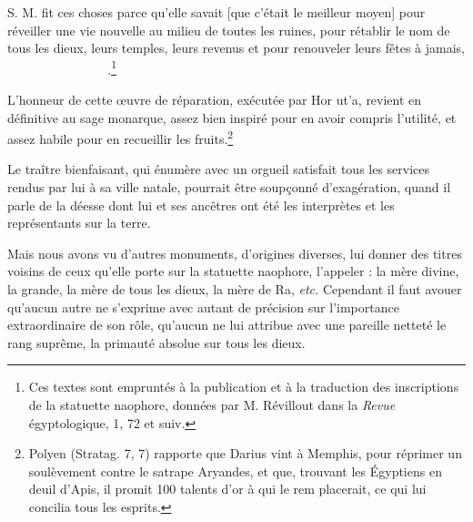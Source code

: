 \documentclass[a4paper, 11pt, oneside]{article}
\newcommand*\hieroAAAH{}
\newcommand*\hieroAABC{\raisebox{0.5ex}{}}
\newcommand*\hieroAACS{}
\newcommand*\hieroAAEF{}
\newcommand*\hieroAAEK{}
\newcommand*\hieroAAEP{\raisebox{0.5ex}{}}
\newcommand*\hieroAAFH{}
\newcommand*\hieroAAHX{}
\newcommand*\hieroAAKT{}
\newcommand*\hieroAALO{}
\newcommand*\hieroAAOH{\raisebox{0.3ex}{}}
\newcommand*\hieroAAOX{}
\newcommand*\hieroAARZ{}
\newcommand*\hieroAASC{}
\newcommand*\hieroAAVY{}
\newcommand*\hieroAAWH{}
\newcommand*\hieroAAWO{}
\newcommand*\hieroAAYI{\raisebox{0.5ex}{}}
\newcommand*\hieroABBP{}
\newcommand*\hieroABBW{}
\newcommand*\hieroABCF{}
\newcommand*\hieroABCG{}
\newcommand*\hieroABCH{}
\newcommand*\hieroABCI{}
\newcommand*\hieroABCJ{}
\newcommand*\hieroABCK{}
\begin{document}
S. M. fit ces choses parce qu’elle savait [que c'était le meilleur moyen] pour réveiller une vie nouvelle au milieu de toutes les ruines, pour rétablir le nom de tous les dieux, leurs temples, leurs revenus et pour renouveler leurs fêtes à jamais, $\hieroAAKT\:\hieroABBW\:\hieroABBP\allowbreak\:\hieroABBP\:\hieroAAYI\:\hieroABCF\allowbreak\:\hieroAASC\hieroAASC\hieroAASC\hieroAASC\allowbreak\:\hieroAAOH\:\hieroAAEP\allowbreak\:\hieroAACS\:\hieroAARZ\allowbreak\:\hieroAALO\:\hieroABCG\:\hieroAAAH\allowbreak\:\hieroAAAH\:\hieroABCH\:\hieroAAOX\allowbreak\:\hieroAABC\:\hieroAAEP\:\hieroAACS\allowbreak\:\hieroAAFH\:\hieroAAVY\:\hieroAAEK\:\hieroAAEK\allowbreak\:\hieroAAEK\:\hieroAABC\:\hieroABCI\allowbreak\:\hieroAAEF\:\hieroAAHX\:\hieroAAEK\allowbreak\:\hieroABCJ\:\hieroAAHX\:\hieroABCK\allowbreak\:\hieroAAWH\:\hieroAAHX\:\hieroAAWO$.\footnote{Ces textes sont empruntés à la publication et à la traduction des inscriptions de la statuette naophore, données par M. Révillout dans la \emph{Revue} égyptologique, 1, 72 et suiv.}

L'honneur de cette œuvre de réparation, exécutée par Hor ut'a, revient en définitive au sage monarque, assez bien inspiré pour en avoir compris l'utilité, et assez habile pour en recueillir les fruits.\footnote{Polyen (Stratag. 7, 7) rapporte que Darius vint à Memphis, pour réprimer un soulèvement contre le satrape Aryandes, et que, trouvant les Égyptiens en deuil d'Apis, il promit 100 talents d'or à qui le rem placerait, ce qui lui concilia tous les esprits.}

Le traître bienfaisant, qui énumère avec un orgueil satisfait tous les services rendus par lui à sa ville natale, pourrait être soupçonné d'exagération, quand il parle de la déesse dont lui et ses ancêtres ont été les interprètes et les représentants sur la terre.

Mais nous avons vu d'autres monuments, d'origines diverses, lui donner des titres voisins de ceux qu'elle porte sur la statuette naophore, l'appeler : la mère divine, la grande, la mère de tous les dieux, la mère de Ra, \emph{etc.} Cependant il faut avouer qu'aucun autre ne s'exprime avec autant de précision sur l'importance extraordinaire de son rôle, qu'aucun ne lui attribue avec une pareille netteté le rang suprême, la primauté absolue sur tous les dieux.
\end{document}
